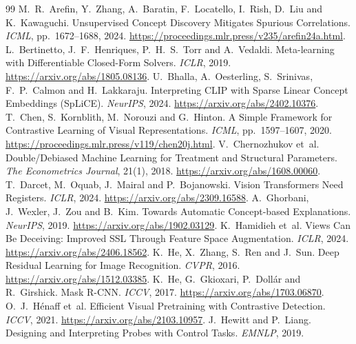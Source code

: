 \documentclass{article}
\begin{document}
\begingroup
\footnotesize
\setlength{\bibsep}{4pt plus 1pt}
\begin{thebibliography}{99}
M.~R.~Arefin, Y.~Zhang, A.~Baratin, F.~Locatello, I.~Rish, D.~Liu and K.~Kawaguchi.
Unsupervised Concept Discovery Mitigates Spurious Correlations.
\emph{ICML}, pp.~1672--1688, 2024.
\url{https://proceedings.mlr.press/v235/arefin24a.html}.
L.~Bertinetto, J.~F.~Henriques, P.~H.~S.~Torr and A.~Vedaldi.
Meta-learning with Differentiable Closed-Form Solvers. \emph{ICLR}, 2019.
\url{https://arxiv.org/abs/1805.08136}.
U.~Bhalla, A.~Oesterling, S.~Srinivas, F.~P.~Calmon and H.~Lakkaraju.
Interpreting CLIP with Sparse Linear Concept Embeddings (SpLiCE).
\emph{NeurIPS}, 2024. \url{https://arxiv.org/abs/2402.10376}.
T.~Chen, S.~Kornblith, M.~Norouzi and G.~Hinton.
A Simple Framework for Contrastive Learning of Visual Representations.
\emph{ICML}, pp.~1597--1607, 2020.
\url{https://proceedings.mlr.press/v119/chen20j.html}.
V.~Chernozhukov et~al.
Double/Debiased Machine Learning for Treatment and Structural Parameters.
\emph{The Econometrics Journal}, 21(1), 2018. \url{https://arxiv.org/abs/1608.00060}.
T.~Darcet, M.~Oquab, J.~Mairal and P.~Bojanowski.
Vision Transformers Need Registers. \emph{ICLR}, 2024.
\url{https://arxiv.org/abs/2309.16588}.
A.~Ghorbani, J.~Wexler, J.~Zou and B.~Kim.
Towards Automatic Concept-based Explanations. \emph{NeurIPS}, 2019.
\url{https://arxiv.org/abs/1902.03129}.
K.~Hamidieh et~al.
Views Can Be Deceiving: Improved SSL Through Feature Space Augmentation.
\emph{ICLR}, 2024. \url{https://arxiv.org/abs/2406.18562}.
K.~He, X.~Zhang, S.~Ren and J.~Sun.
Deep Residual Learning for Image Recognition. \emph{CVPR}, 2016.
\url{https://arxiv.org/abs/1512.03385}.
K.~He, G.~Gkioxari, P.~Doll\'ar and R.~Girshick.
Mask R-CNN. \emph{ICCV}, 2017. \url{https://arxiv.org/abs/1703.06870}.
O.~J.~H\'enaff et~al.
Efficient Visual Pretraining with Contrastive Detection. \emph{ICCV}, 2021.
\url{https://arxiv.org/abs/2103.10957}.
J.~Hewitt and P.~Liang.
Designing and Interpreting Probes with Control Tasks. \emph{EMNLP}, 2019.

\end{thebibliography}
\end{document}
